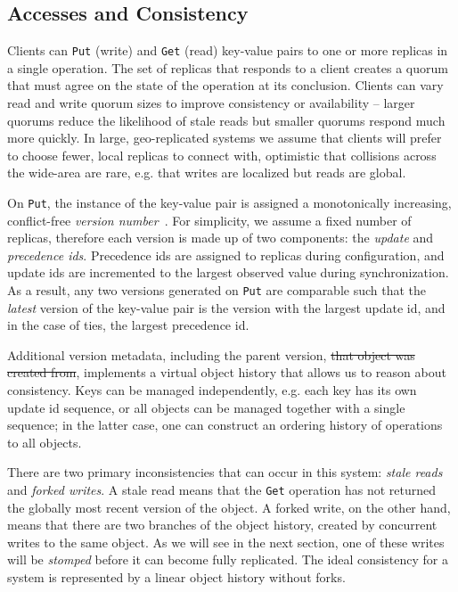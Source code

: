 \subsection*{Accesses and Consistency}

Clients can \texttt{Put} (write) and \texttt{Get} (read) key-value pairs to
one or more replicas in a single operation.
The set of replicas that responds to a client creates a quorum that must
agree on the state of the operation at its conclusion.
Clients can vary read and write quorum sizes to improve consistency or
availability -- larger quorums reduce the likelihood of stale reads but
smaller quorums respond much more quickly.
In large, geo-replicated systems we assume that clients will prefer to choose
fewer, local replicas to connect with, optimistic that collisions across the
wide-area are rare, e.g. that writes are localized but reads are global.

On \texttt{Put}, the instance of the key-value pair is assigned a
monotonically increasing, conflict-free \textit{version
number}~\cite{almeida_version_2002}.
For simplicity, we assume a fixed number of replicas, therefore each version
is made up of two components: the \textit{update} and \textit{precedence ids}.
Precedence ids are assigned to replicas during configuration, and update ids
are incremented to the largest observed value during synchronization.
As a result, any two versions generated on \texttt{Put} are comparable such
that the \textit{latest} version of the key-value pair is the version with the
largest update id, and in the case of ties, the largest precedence id.

Additional version metadata, including the parent version,
 \sout{that object was created from}, 
implements a virtual object history that allows us to reason
about consistency.
Keys can be managed independently, e.g. each key has its own update id
sequence, or all objects can be managed together with a single sequence; in
the latter case, one can construct an ordering history of
operations to all objects.

There are two primary inconsistencies that can occur in this system:
\textit{stale reads} and \textit{forked writes}.
A stale read means that the \texttt{Get} operation has not returned
the globally most recent version of the object.
A forked write, on the other hand, means that there are two branches of the
object history, created by concurrent writes to the same object.
As we will see in the next section, one of these writes will be
\textit{stomped} before it can become fully replicated.
The ideal consistency for a system is represented by a linear object history
without forks.

